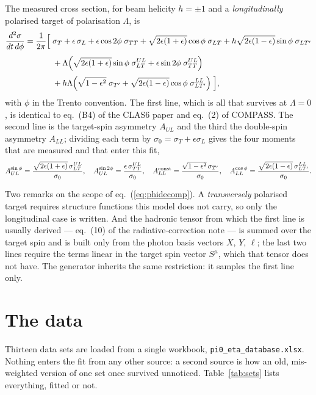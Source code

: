 \documentclass[11pt,a4paper]{article}
\newcommand{\sig}[1]{\sigma_{#1}}
\begin{document}
The measured cross section, for beam helicity $h = \pm 1$ and a
\emph{longitudinally} polarised target of polarisation $\Lambda$, is
\begin{align}
\frac{d^2\sigma}{dt\,d\phi} = \frac{1}{2\pi}\Big[\;
& \sig{T} + \epsilon\,\sig{L}
+ \epsilon\cos 2\phi\; \sig{TT}
+ \sqrt{2\epsilon(1+\epsilon)}\cos\phi\; \sig{LT}
+ h\sqrt{2\epsilon(1-\epsilon)}\sin\phi\; \sig{LT'}
\notag\\[1mm]
& + \Lambda\Big(\sqrt{2\epsilon(1+\epsilon)}\sin\phi\; \sig{LT}^{UL}
              + \epsilon\sin 2\phi\; \sig{TT}^{UL}\Big)
\notag\\[1mm]
& + h\Lambda\Big(\sqrt{1-\epsilon^2}\; \sig{T'}
               + \sqrt{2\epsilon(1-\epsilon)}\cos\phi\; \sig{LT'}^{LL}\Big)
\;\Big],
\label{eq:phidecomp}
\end{align}
with $\phi$ in the Trento convention.  The first line, which is all that
survives at $\Lambda = 0$, is identical to eq.~(B4) of the CLAS6 paper and
eq.~(2) of COMPASS.  The second line is the target-spin asymmetry $A_{UL}$ and
the third the double-spin asymmetry $A_{LL}$; dividing each term by
$\sigma_0 = \sig{T} + \epsilon\sig{L}$ gives the four moments that are measured
and that enter this fit,
\begin{equation}
A_{UL}^{\sin\phi} = \frac{\sqrt{2\epsilon(1+\epsilon)}\,\sig{LT}^{UL}}{\sigma_0},
\quad
A_{UL}^{\sin 2\phi} = \frac{\epsilon\,\sig{TT}^{UL}}{\sigma_0},
\quad
A_{LL}^{\rm const} = \frac{\sqrt{1-\epsilon^2}\,\sig{T'}}{\sigma_0},
\quad
A_{LL}^{\cos\phi} = \frac{\sqrt{2\epsilon(1-\epsilon)}\,\sig{LT'}^{LL}}{\sigma_0}.
\label{eq:polmoments}
\end{equation}

Two remarks on the scope of eq.~(\ref{eq:phidecomp}).  A \emph{transversely}
polarised target requires structure functions this model does not carry, so only
the longitudinal case is written.  And the hadronic tensor from which the first
line is usually derived --- eq.~(10) of the radiative-correction note --- is
summed over the target spin and is built only from the photon basis vectors
$X$, $Y$, $\ell$; the last two lines require the terms linear in the target spin
vector $S^\mu$, which that tensor does not have.  The generator inherits the
same restriction: it samples the first line only.

\section{The data}

Thirteen data sets are loaded from a single workbook,
\texttt{pi0\_eta\_database.xlsx}.  Nothing enters the fit from any other
source: a second source is how an old, mis-weighted version of one set once
survived unnoticed.  Table~\ref{tab:sets} lists everything, fitted or not.
\end{document}
